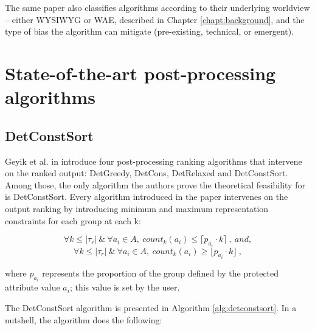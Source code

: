The same paper also classifies algorithms according to their underlying worldview – either WYSIWYG or WAE, described in Chapter \ref{chapt:background}, and the type of bias the algorithm can mitigate (pre-existing, technical, or emergent).

\section{State-of-the-art post-processing algorithms}\label{sect:existing}

\subsection{DetConstSort}\label{subsect:dcs}

Geyik et al. in \cite{linkedin} introduce four post-processing ranking algorithms that intervene on the ranked output: DetGreedy, DetCons, DetRelaxed and DetConstSort. Among those, the only algorithm the authors prove the theoretical feasibility for is DetConstSort. Every algorithm introduced in the paper intervenes on the output ranking by introducing minimum and maximum representation constraints for each group at each k:

\small
\begin{equation}
\label{eq:feasibility_lower}
\forall k \leq |\tau_r| ~ \& ~ \forall a_i \in A, ~ count_k(a_i) \leq \lceil p_{a_i} \cdot k \rceil~, ~ and,
\end{equation}
\begin{equation}
\label{eq:feasibility_upper}
\forall k \leq |\tau_r| ~ \& ~ \forall a_i \in A, ~ count_k(a_i) \geq \lfloor p_{a_i} \cdot k \rfloor ~,
\end{equation}
\normalsize

where $p_{a_i}$ represents the proportion of the group defined by the protected attribute value ${a_i}$; this value is set by the user.

The DetConstSort algorithm is presented in Algorithm \ref{alg:detconstsort}. In a nutshell, the algorithm does the following:

